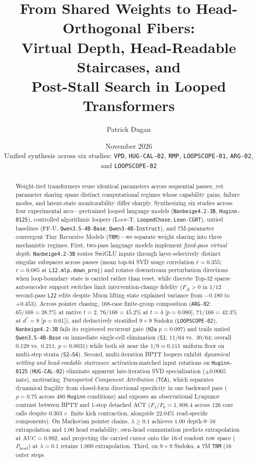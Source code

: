 \documentclass[10pt,letterpaper]{article}
\title{\bfseries From Shared Weights to Head-Orthogonal Fibers:\\[0.30em]
Virtual Depth, Head-Readable Staircases, and\\[0.14em]
Post-Stall Search in Looped Transformers}
\author{Patrick Dugan}
\date{November 2026\\[0.2em]\normalsize Unified synthesis across six studies: \texttt{VPD}, \texttt{HUG-CAL-02}, \texttt{RMP}, \texttt{LOOPSCOPE-01}, \texttt{ARG-02}, and \texttt{LOOPSCOPE-02}}
\newcommand{\LoopT}{\textsc{Loop-T}}
\newcommand{\FFU}{\textsc{FF-U}}
\newcommand{\Phead}{P_{\mathrm{head}}}
\begin{document}
\maketitle
\vspace{-0.70em}

\begin{abstract}
\noindent
Weight-tied transformers reuse identical parameters across sequential passes, yet parameter sharing spans distinct computational regimes whose capability gains, failure modes, and latent-state monitorability differ sharply. Synthesizing six studies across four experimental arcs—pretrained looped language models (\texttt{Nanbeige4.2-3B}, \texttt{Huginn-0125}), controlled algorithmic loopers (\LoopT, \texttt{LoopedChase}, \texttt{Lean-CGRT}), untied baselines (\FFU, \texttt{Qwen3.5-4B-Base}, \texttt{Qwen3-4B-Instruct}), and 7M-parameter convergent Tiny Recursive Models (\texttt{TRM})—we separate weight sharing into three mechanistic regimes. First, two-pass language models implement \emph{fixed-pass virtual depth}: \texttt{Nanbeige4.2-3B} routes SwiGLU inputs through layer-selectively distinct singular subspaces across passes (mean top-64 SVD usage correlation $\bar{r}=0.355$; $r=0.085$ at \texttt{L12.mlp.down\_proj}) and rotates downstream perturbation directions when loop-boundary state is carried rather than reset, while discrete Top-32 sparse autoencoder support switches limit intervention-change fidelity ($F_\Delta > 0$ in $1/12$ second-pass \texttt{L22} edits despite Muon lifting state explained variance from $-0.180$ to $+0.453$). Across pointer chasing, 168-case finite-group composition (\texttt{ARG-02}: $65/168 = 38.7\%$ at native $t=2$, $76/168 = 45.2\%$ at $t=4$ [$p=0.080$], $71/168 = 42.3\%$ at $d^*=8$ [$p=0.61$]), and deductively stratified $9\times 9$ Sudoku (\texttt{LOOPSCOPE-02}), \texttt{Nanbeige4.2-3B} fails its registered recurrent gate (\texttt{H2a} $p=0.097$) and trails untied \texttt{Qwen3.5-4B-Base} on immediate single-cell elimination (\texttt{S1}: $11/64$ vs.\ $30/64$; overall $0.129$ vs.\ $0.211$, $p=0.0031$) while both sit near the $1/9 \approx 0.111$ uniform floor on multi-step strata (\texttt{S2--S4}). Second, multi-iteration BPTT loopers exhibit \emph{dynamical settling and head-readable staircases}: activation-matched input rotations on \texttt{Huginn-0125} (\texttt{HUG-CAL-02}) eliminate apparent late-iteration SVD specialization ($\pm 0.0065$ nats), motivating \emph{Transported Component Attribution} (\texttt{TCA}), which separates dynamical fragility from closed-form directional specificity in one backward pass ($\rho=0.75$ across 480 \texttt{Huginn} conditions) and exposes an observational Lyapunov contrast between BPTT and 1-step detached ACT ($F_1/F_6 = 1{,}808.4$ across 126 core calls despite $0.303\times$ finite kick contraction, alongside $22.04\%$ read-specific components). On Markovian pointer chains, $\lambda \ge 0.1$ achieves $1.00$ depth-9--16 extrapolation and $1.00$ head readability, own-head commutation predicts extrapolation at $\mathrm{AUC}=0.992$, and projecting the carried cursor onto the 16-d readout row space ($\Phead$) at $\lambda=0.1$ retains $1.000$ extrapolation. Third, on $9\times 9$ Sudoku, a 7M \texttt{TRM} (16 outer steps 
\end{abstract}
\end{document}
